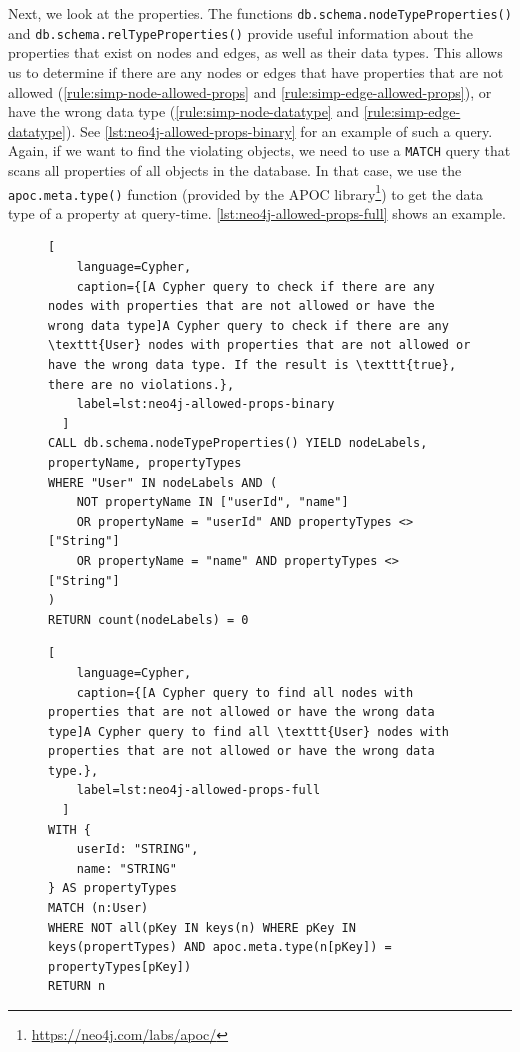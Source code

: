 \documentclass{report}
\theoremstyle{definition}
\begin{document}
Next, we look at the properties. The functions \texttt{db.schema.nodeTypeProperties()} and \texttt{db.schema.relTypeProperties()} provide useful information about the properties that exist on nodes and edges, as well as their data types. This allows us to determine if there are any nodes or edges that have properties that are not allowed (\autoref{rule:simp-node-allowed-props} and \ref{rule:simp-edge-allowed-props}), or have the wrong data type (\autoref{rule:simp-node-datatype} and \ref{rule:simp-edge-datatype}). See \autoref{lst:neo4j-allowed-props-binary} for an example of such a query. Again, if we want to find the violating objects, we need to use a \texttt{MATCH} query that scans all properties of all objects in the database. In that case, we use the \texttt{apoc.meta.type()} function (provided by the APOC library\footnote{\url{https://neo4j.com/labs/apoc/}}) to get the data type of a property at query-time. \autoref{lst:neo4j-allowed-props-full} shows an example.

\begin{figure}[H]
  \begin{lstlisting}[
    language=Cypher,
    caption={[A Cypher query to check if there are any nodes with properties that are not allowed or have the wrong data type]A Cypher query to check if there are any \texttt{User} nodes with properties that are not allowed or have the wrong data type. If the result is \texttt{true}, there are no violations.},
    label=lst:neo4j-allowed-props-binary
  ]
CALL db.schema.nodeTypeProperties() YIELD nodeLabels, propertyName, propertyTypes
WHERE "User" IN nodeLabels AND (
    NOT propertyName IN ["userId", "name"]
    OR propertyName = "userId" AND propertyTypes <> ["String"]
    OR propertyName = "name" AND propertyTypes <> ["String"]
)
RETURN count(nodeLabels) = 0
  \end{lstlisting}
\end{figure}
\vspace*{-8pt}
\begin{figure}[H]
  \begin{lstlisting}[
    language=Cypher,
    caption={[A Cypher query to find all nodes with properties that are not allowed or have the wrong data type]A Cypher query to find all \texttt{User} nodes with properties that are not allowed or have the wrong data type.},
    label=lst:neo4j-allowed-props-full
  ]
WITH {
    userId: "STRING",
    name: "STRING"
} AS propertyTypes
MATCH (n:User)
WHERE NOT all(pKey IN keys(n) WHERE pKey IN keys(propertTypes) AND apoc.meta.type(n[pKey]) = propertyTypes[pKey])
RETURN n
  \end{lstlisting}
\end{figure}
\end{document}
